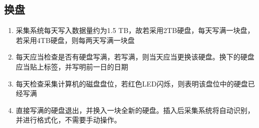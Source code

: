 \documentclass[11pt,includemp,a4paper]{article}
\begin{document}
\subsection{换盘}
\begin{enumerate}
    \item 采集系统每天写入数据量约为1.5 TB，故若采用2TB硬盘，每天写满一块盘，若采用4TB硬盘，则每两天写满一块盘
    \item 每天应当检查是否有硬盘写满，若写满，则当天应当更换该硬盘。换下的硬盘应当贴上标签，并写明前一日的日期
    \item 每天检查采集计算机的磁盘盘位，若红色LED闪烁，则表明该盘位中的硬盘已经写满
    \item 直接写满的硬盘退出，并换入一块全新的硬盘。插入后采集系统将自动识别，并进行格式化，不需要手动操作。
\end{enumerate}
\end{document}

